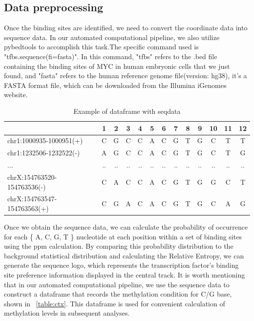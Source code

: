 \documentclass{PHlab-thesis}
\begin{document}
\subsection{Data preprocessing} \label{sssec:num1}
Once the binding sites are identified, we need to convert the coordinate data into sequence data. In our automated computational pipeline, we also utilize pybedtools to accomplish this task.The specific command used is "tfbs.sequence(fi=fasta)". In this command, "tfbs" refers to the .bed file containing the binding sites of MYC in human embryonic cells that we just found, and "fasta" refers to the human reference genome file(version: hg38), it's a FASTA format file, which can be downloaded from the Illumina iGenomes website.
\begin{table}[H]
	\centering
	\begin{tabular}{l*{12}{c}}
		\toprule
		         & 1 &  2&  3&4  &5&6&7&8&  9& 10 & 11&12\\
		\midrule
		chr1:1000935-1000951(+)     & C  &G  &C  &C  &A  &C  &G  &T  &G  &C  &T  &T		\\
		chr1:1232506-1232522(-)      &A  &G  &C  &C  &A  &C  &G  &T  &G  &C  &T  &G\\
		...   &.. &.. &.. &.. &.. &.. &.. &.. &.. &.. &.. &..\\
		
		chrX:154763520-154763536(-)  &C  &A  &C & C & A  &C  &G  &T  &G  &G  &C  &T\\
		chrX:154763547-154763563(+) & C  &G  &A  &C  &A  &C  &G  &T  &G  &C  &A  &G\\
		\bottomrule
	\end{tabular}
	\caption{Example of dataframe with seqdata}
	\label{table:seqdata}
\end{table}
Once we obtain the sequence data, we can calculate the probability of occurrence for each \{ A, C, G, T \} nucleotide at each position within a set of binding sites using the ppm calculation. By comparing this probability distribution to the background statistical distribution and calculating the Relative Entropy, we can generate the sequence logo, which represents the transcription factor's binding site preference information displayed in the central track. It is worth mentioning that in our automated computational pipeline, we use the sequence data to construct a dataframe that records the methylation condition for C/G base, shown in ~\ref{table:ctx}. This dataframe is used for convenient calculation of methylation levels in subsequent analyses.
\end{document}
